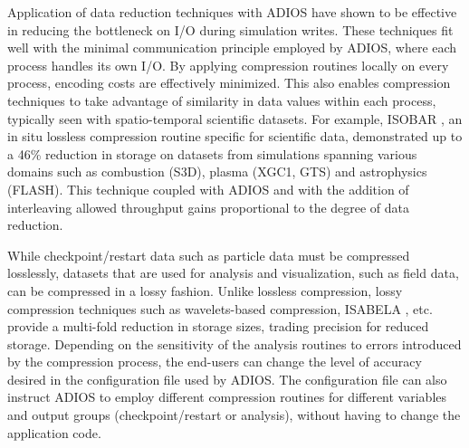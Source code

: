 Application of data reduction techniques with ADIOS have shown to be effective in reducing the
bottleneck on I/O during simulation writes. These techniques fit well with the minimal communication
principle employed by ADIOS, where each process handles its own I/O. By applying compression
routines locally on every process, encoding costs are effectively minimized. This also enables
compression techniques to take advantage of similarity in data values within each process, typically
seen with spatio-temporal scientific datasets. For example, ISOBAR \cite{ADIOS:Schendel2012b}, an in situ
lossless compression routine specific for scientific data, demonstrated up to a 46\% reduction in
storage on datasets from simulations spanning various domains such as combustion (S3D), plasma
(XGC1, GTS) and astrophysics (FLASH). This technique coupled with ADIOS and with the addition of
interleaving allowed throughput gains proportional to the degree of data reduction.

While checkpoint/restart data such as particle data must be compressed losslessly, datasets that are
used for analysis and visualization, such as field data, can be compressed in a lossy fashion.
Unlike lossless compression, lossy compression techniques such as wavelets-based compression,
ISABELA \cite{ADIOS:Lakshminarasimhan2013a}, etc. provide a multi-fold reduction in storage sizes, trading
precision for reduced storage. Depending on the sensitivity of the analysis routines to errors
introduced by the compression process, the end-users can change the level of accuracy desired in the
configuration file used by ADIOS. The configuration file can also instruct ADIOS to employ different
compression routines for different variables and output groups (checkpoint/restart or analysis),
without having to change the application code.

